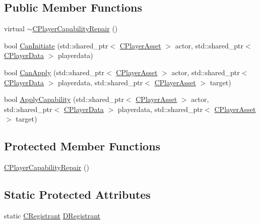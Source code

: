\subsection*{Public Member Functions}
\begin{DoxyCompactItemize}
\item 
virtual \hyperlink{classCPlayerCapabilityRepair_ad8ed0fc101b58a3b4eeb42fa3cab0511}{$\sim$\+C\+Player\+Capability\+Repair} ()
\item 
bool \hyperlink{classCPlayerCapabilityRepair_a579761cab74d447b95856a24a7841b2e}{Can\+Initiate} (std\+::shared\+\_\+ptr$<$ \hyperlink{classCPlayerAsset}{C\+Player\+Asset} $>$ actor, std\+::shared\+\_\+ptr$<$ \hyperlink{classCPlayerData}{C\+Player\+Data} $>$ playerdata)
\item 
bool \hyperlink{classCPlayerCapabilityRepair_ae989c67c5e14bbba5b2ddda993ee635a}{Can\+Apply} (std\+::shared\+\_\+ptr$<$ \hyperlink{classCPlayerAsset}{C\+Player\+Asset} $>$ actor, std\+::shared\+\_\+ptr$<$ \hyperlink{classCPlayerData}{C\+Player\+Data} $>$ playerdata, std\+::shared\+\_\+ptr$<$ \hyperlink{classCPlayerAsset}{C\+Player\+Asset} $>$ target)
\item 
bool \hyperlink{classCPlayerCapabilityRepair_ab4e8da6f225b4bfb7023d75749454ff1}{Apply\+Capability} (std\+::shared\+\_\+ptr$<$ \hyperlink{classCPlayerAsset}{C\+Player\+Asset} $>$ actor, std\+::shared\+\_\+ptr$<$ \hyperlink{classCPlayerData}{C\+Player\+Data} $>$ playerdata, std\+::shared\+\_\+ptr$<$ \hyperlink{classCPlayerAsset}{C\+Player\+Asset} $>$ target)
\end{DoxyCompactItemize}
\subsection*{Protected Member Functions}
\begin{DoxyCompactItemize}
\item 
\hyperlink{classCPlayerCapabilityRepair_a1c11519a127c65cd5b5ead8d9537c240}{C\+Player\+Capability\+Repair} ()
\end{DoxyCompactItemize}
\subsection*{Static Protected Attributes}
\begin{DoxyCompactItemize}
\item 
static \hyperlink{classCPlayerCapabilityRepair_1_1CRegistrant}{C\+Registrant} \hyperlink{classCPlayerCapabilityRepair_ac0cc247c8d2ba96b6c6feabfcfb6ac19}{D\+Registrant}
\end{DoxyCompactItemize}
